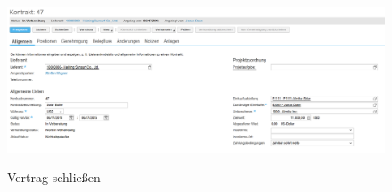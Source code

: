 \begin{figure}[H]
	\begin{center}
	\includegraphics[width=1.0\textwidth]{grafiken/ByDesign-HowTo-4.png}
	\caption{Vertrag schließen}
	\vspace{-10pt}
	\label{abb:byd-newsupplier}
	\end{center}
\end{figure}

\vspace{-10pt}